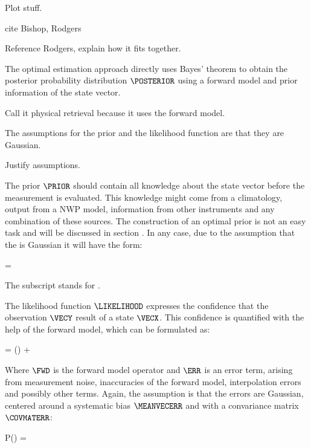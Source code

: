     
    Plot stuff.

    cite Bishop, Rodgers

\stopsection


\startsection[title={Optimal Estimation},reference=ret_optimest]

    Reference Rodgers, explain how it fits together.

    The optimal estimation approach directly uses Bayes' theorem
     to obtain the posterior probability distribution
    $\POSTERIOR$ using a forward model and prior information of the state
    vector.

    Call it physical retrieval because it uses the forward model.

    The assumptions for the prior {\PDF} and the likelihood function
    are that they are Gaussian.

    Justify assumptions.

    The prior $\PRIOR$ should contain all knowledge about the state vector
    before the measurement is evaluated. This knowledge might come from
    a climatology, output from a NWP model, information from other instruments
    and any combination of these sources. The construction of an optimal prior
    is not an easy task and will be discussed in section .
    In any case, due to the assumption that the {\PDF} is Gaussian it will have
    the form:

    \startformula
        \PRIOR = \GAUSS{\VECX}{\MEANVECA}{\COVMATA}
    \stopformula

    The subscript stands for .

    The likelihood function $\LIKELIHOOD$ expresses the confidence that the
    observation $\VECY$ result of a state $\VECX$. This confidence is
    quantified with the help of the forward model, which can be formulated as:

    \startformula
        \VECY = \FWD(\VECX) + \ERR
    \stopformula

    Where $\FWD$ is the forward model operator and $\ERR$ is an error term,
    arising from measurement noise, inaccuracies of the forward model,
    interpolation errors and possibly other terms. Again, the assumption is
    that the errors are Gaussian, centered around a systematic bias
    $\MEANVECERR$ and with a convariance matrix $\COVMATERR$:

    \startformula
        P(\ERR) = \GAUSS{\ERR}{\MEANVECERR}{\COVMATERR}
    \stopformula

